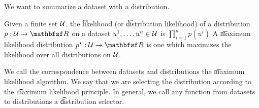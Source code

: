 
We want to summarize a dataset with a distribution.


Given a finite set $\mathcal{U}$, the \t{likelihood} (or \t{distribution likelihood}) of a distribution $p: \CU \to \R$ on a dataset $u^1, \dots, u^n \in \mathcal{U}$ is $\prod_{i = 1}^{n} p(u^i)$
A \t{maximum likelihood distribution} $p^\star: \CU \to \R$ is one which maximizes the likelihood over all distributions on $\mathcal{U}$.

We call the correspondence between datasets and distributions the \t{maximum likelihood algorithm}.
We say that we are selecting the distribution according to the \t{maximum likelihood principle}.
In general, we call any function from datasets to distributions a \t{distribution selector}.

\blankpage
